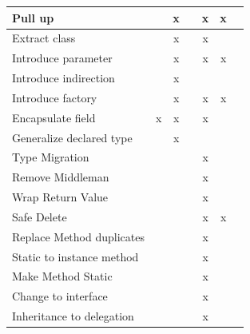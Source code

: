 \begin{table}
\begin{tabular}{|l|c|c|c|c|c|c|}
Pull up                   &               & x       &     & x        & x        &          \\ \hline
Extract class             &               & x       &     & x        &          &          \\ \hline
Introduce parameter       &               & x       &     & x        & x        &          \\ \hline
Introduce indirection     &               & x       &     &          &          &          \\ \hline
Introduce factory         &               & x       &     & x        & x        &          \\ \hline
Encapsulate field         & x             & x       &     & x        &          &          \\ \hline
Generalize declared type  &               & x       &     &          &          &          \\ \hline
Type Migration            &               &         &     & x        &          &          \\ \hline
Remove Middleman          &               &         &     & x        &          &          \\ \hline
Wrap Return Value         &               &         &     & x        &          &          \\ \hline
Safe Delete               &               &         &     & x        & x        &          \\ \hline
Replace Method duplicates &               &         &     & x        &          &          \\ \hline
Static to instance method &               &         &     & x        &          &          \\ \hline
Make Method Static        &               &         &     & x        &          &          \\ \hline
Change to interface 	  &               &         &     & x        &          &          \\ \hline
Inheritance to delegation &               &         &     & x        &          &          \\ \hline
\end{tabular}
\end{table}
 
